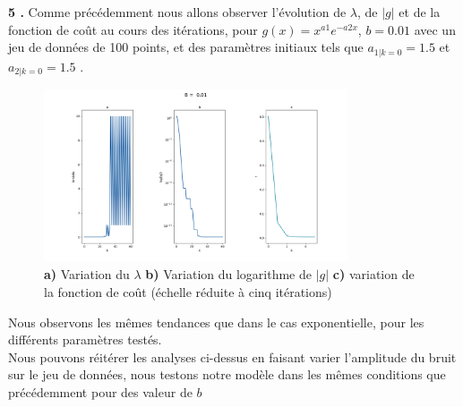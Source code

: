 \documentclass[12pt]{article}
\begin{document}
 \textbf{\color{brick}5 .} Comme précédemment nous allons observer l'évolution de $\lambda$, de $|g|$ et de la fonction de coût au cours des itérations, pour $g(x)=x^{a1}e^{-a2x} $, $b=0.01$ avec un jeu de données de 100 points, et des paramètres initiaux tels que $a_{1|k=0}=1.5$ et $a_{2|k=0}=1.5$ . 
 
  \begin{figure}[H]
\centering
\includegraphics[width=0.8\textwidth]{Q16FFF.png}
\caption{\textbf{a)} Variation du $\lambda$ \textbf{b)} Variation du logarithme de $|g|$ \textbf{c)} variation de la fonction de coût (échelle réduite à cinq itérations)}
\label{FigQ12}
\end{figure}
 
Nous observons les mêmes tendances que dans le cas exponentielle, pour les différents paramètres testés. \\

Nous pouvons réitérer les analyses ci-dessus en faisant varier l'amplitude du bruit sur le jeu de données, nous testons notre modèle dans les mêmes conditions que précédemment pour des valeur de $b $
\end{document}
